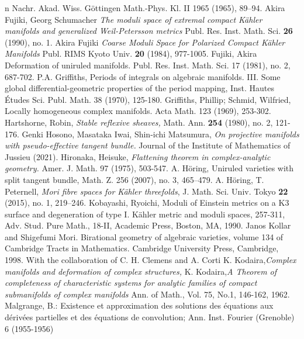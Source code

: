 \documentclass[a4, 12pt]{amsart}
\numberwithin{equation}{section}
\theoremstyle{definition}
\begin{document}
\begin{thebibliography}{n}
Nachr. Akad. Wiss. G\"ottingen Math.-Phys. Kl. II 1965 (1965), 89--94.
Akira Fujiki, Georg Schumacher
\textit{The moduli space of extremal compact K\"ahler manifolds and generalized Weil-Petersson metrics}
Publ. Res. Inst. Math. Sci. \textbf{26} (1990), no. 1.
Akira Fujiki
\textit{Coarse Moduli Space for Polarized Compact K\"ahler Manifolds}
Publ. RIMS Kyoto Univ. \textbf{20} (1984), 977-1005.
Fujiki, Akira
Deformation of uniruled manifolds.
Publ. Res. Inst. Math. Sci. 17 (1981), no. 2, 687-702.
P.A. Griffiths, Periods of integrals on algebraic manifolds. III. Some
global differential-geometric properties of the period mapping, Inst.
Hautes  \'Etudes Sci. Publ. Math. 38 (1970), 125-180.
Griffiths, Phillip; Schmid, Wilfried,
Locally homogeneous complex manifolds.
Acta Math. 123 (1969), 253-302. 
Hartshorne, Robin,
{\em Stable reflexive sheaves,} Math. Ann. \textbf{254} (1980), no. 2, 121-176.
Genki Hosono, Masataka Iwai, Shin-ichi Matsumura,
{\em On projective manifolds with pseudo-effective tangent bundle.} Journal of the Institute of Mathematics of Jussieu (2021). 
Hironaka, Heisuke, {\em
Flattening theorem in complex-analytic geometry.}
Amer. J. Math. 97 (1975), 503-547. 
A. H\"{o}ring, Uniruled varieties with split tangent bundle, Math. Z. 256 (2007), no. 3, 465–479.
A. H\"{o}ring, T. Peternell,
\textit{Mori fibre spaces for K\"ahler threefolds},
J. Math. Sci. Univ. Tokyo {\bf{22}} (2015), no. 1, 219--246.
Kobayashi, Ryoichi,
Moduli of Einstein metrics on a K3 surface and degeneration of type I. K\"ahler metric and moduli spaces, 257-311,
Adv. Stud. Pure Math., 18-II, Academic Press, Boston, MA, 1990. 
Janos Kollar and Shigefumi Mori. Birational geometry of algebraic varieties, volume
134 of Cambridge Tracts in Mathematics. Cambridge University Press, Cambridge,
1998. With the collaboration of C. H. Clemens and A. Corti
 K. Kodaira,{\em Complex manifolds and deformation of complex structures,}
 K. Kodaira,{\em A Theorem of completeness of characteristic systems for analytic families of compact submanifolds of complex manifolds}
Ann. of Math., Vol. 75, No.1, 146-162, 1962.
Malgrange, B.: Existence et approximation des solutions des \'equations aux d\'eriv\'ees
partielles et des \'equations de convolution; Ann. Inst. Fourier (Grenoble) 6 (1955-1956)

\end{thebibliography}
\end{document}
